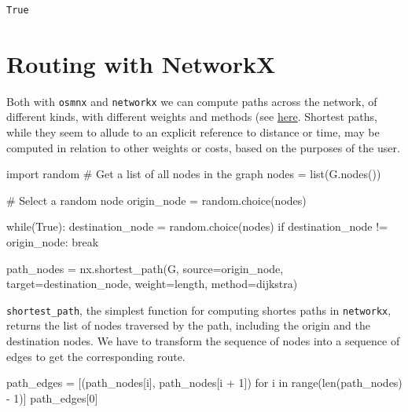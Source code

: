 \documentclass[
  letterpaper,
  DIV=11,
  numbers=noendperiod]{scrreprt}
\newenvironment{Shaded}{\begin{snugshade}}{\end{snugshade}}
\newcommand{\BuiltInTok}[1]{\textcolor[rgb]{0.00,0.23,0.31}{#1}}
\newcommand{\CommentTok}[1]{\textcolor[rgb]{0.37,0.37,0.37}{#1}}
\newcommand{\ControlFlowTok}[1]{\textcolor[rgb]{0.00,0.23,0.31}{#1}}
\newcommand{\DecValTok}[1]{\textcolor[rgb]{0.68,0.00,0.00}{#1}}
\newcommand{\ImportTok}[1]{\textcolor[rgb]{0.00,0.46,0.62}{#1}}
\newcommand{\KeywordTok}[1]{\textcolor[rgb]{0.00,0.23,0.31}{#1}}
\newcommand{\NormalTok}[1]{\textcolor[rgb]{0.00,0.23,0.31}{#1}}
\newcommand{\OperatorTok}[1]{\textcolor[rgb]{0.37,0.37,0.37}{#1}}
\newcommand{\StringTok}[1]{\textcolor[rgb]{0.13,0.47,0.30}{#1}}
\newcommand{\VariableTok}[1]{\textcolor[rgb]{0.07,0.07,0.07}{#1}}
\begin{document}
\begin{verbatim}
True
\end{verbatim}

\section{Routing with NetworkX}\label{routing-with-networkx}

Both with \texttt{osmnx} and \texttt{networkx} we can compute paths
across the network, of different kinds, with different weights and
methods (see
\href{https://networkx.org/documentation/stable/reference/algorithms/shortest_paths.html}{here}.
Shortest paths, while they seem to allude to an explicit reference to
distance or time, may be computed in relation to other weights or costs,
based on the purposes of the user.

\begin{Shaded}
\begin{Highlighting}[]
\ImportTok{import}\NormalTok{ random}
\CommentTok{\# Get a list of all nodes in the graph}
\NormalTok{nodes }\OperatorTok{=} \BuiltInTok{list}\NormalTok{(G.nodes())}

\CommentTok{\# Select a random node}
\NormalTok{origin\_node }\OperatorTok{=}\NormalTok{ random.choice(nodes)}

\ControlFlowTok{while}\NormalTok{(}\VariableTok{True}\NormalTok{):}
\NormalTok{    destination\_node }\OperatorTok{=}\NormalTok{ random.choice(nodes)}
    \ControlFlowTok{if}\NormalTok{ destination\_node }\OperatorTok{!=}\NormalTok{ origin\_node:}
        \ControlFlowTok{break}

\NormalTok{path\_nodes }\OperatorTok{=}\NormalTok{ nx.shortest\_path(G, source}\OperatorTok{=}\NormalTok{origin\_node, target}\OperatorTok{=}\NormalTok{destination\_node, weight}\OperatorTok{=}\StringTok{\textquotesingle{}length\textquotesingle{}}\NormalTok{, method}\OperatorTok{=}\StringTok{\textquotesingle{}dijkstra\textquotesingle{}}\NormalTok{)}
\end{Highlighting}
\end{Shaded}

\texttt{shortest\_path}, the simplest function for computing shortes
paths in \texttt{networkx}, returns the list of nodes traversed by the
path, including the origin and the destination nodes. We have to
transform the sequence of nodes into a sequence of edges to get the
corresponding route.

\begin{Shaded}
\begin{Highlighting}[]
\NormalTok{path\_edges }\OperatorTok{=}\NormalTok{ [(path\_nodes[i], path\_nodes[i }\OperatorTok{+} \DecValTok{1}\NormalTok{]) }\ControlFlowTok{for}\NormalTok{ i }\KeywordTok{in} \BuiltInTok{range}\NormalTok{(}\BuiltInTok{len}\NormalTok{(path\_nodes) }\OperatorTok{{-}} \DecValTok{1}\NormalTok{)] }
\NormalTok{path\_edges[}\DecValTok{0}\NormalTok{]}
\end{Highlighting}
\end{Shaded}
\end{document}
